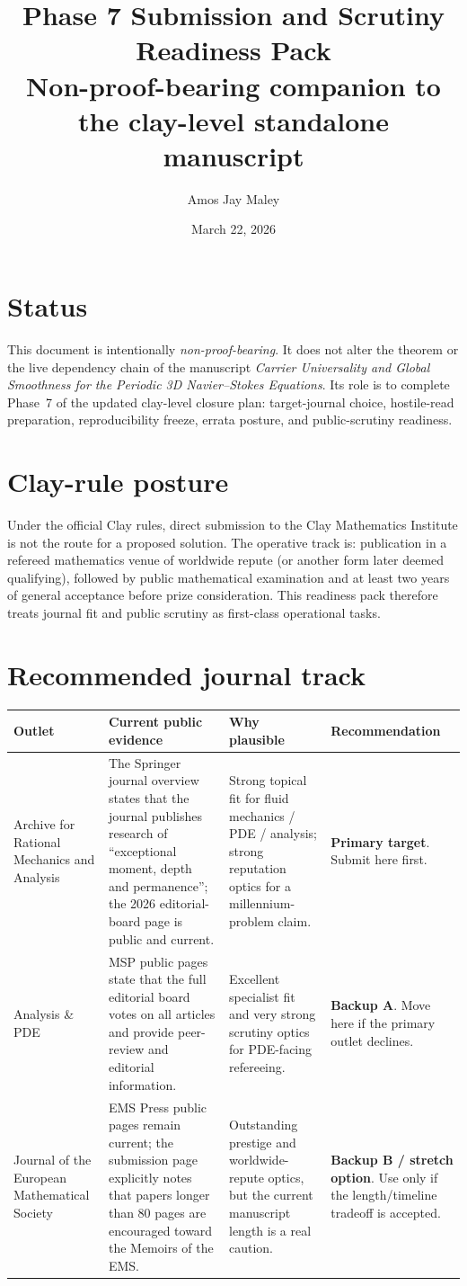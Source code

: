 \documentclass[11pt]{article}
\title{\textbf{Phase 7 Submission and Scrutiny Readiness Pack}\\[0.3em]\large Non-proof-bearing companion to the clay-level standalone manuscript}
\author{Amos Jay Maley}
\date{March 22, 2026}
\begin{document}
\maketitle

\section*{Status}
This document is intentionally \emph{non-proof-bearing}. It does not alter the theorem or the live dependency chain of the manuscript \emph{Carrier Universality and Global Smoothness for the Periodic 3D Navier--Stokes Equations}. Its role is to complete Phase~7 of the updated clay-level closure plan: target-journal choice, hostile-read preparation, reproducibility freeze, errata posture, and public-scrutiny readiness.

\section{Clay-rule posture}
Under the official Clay rules, direct submission to the Clay Mathematics Institute is not the route for a proposed solution. The operative track is: publication in a refereed mathematics venue of worldwide repute (or another form later deemed qualifying), followed by public mathematical examination and at least two years of general acceptance before prize consideration. This readiness pack therefore treats journal fit and public scrutiny as first-class operational tasks.

\section{Recommended journal track}
\begin{tabularx}{\textwidth}{@{}L{0.19\textwidth}L{0.28\textwidth}L{0.21\textwidth}Y@{}}
\toprule
\textbf{Outlet} & \textbf{Current public evidence} & \textbf{Why plausible} & \textbf{Recommendation}\\
\midrule
Archive for Rational Mechanics and Analysis & The Springer journal overview states that the journal publishes research of ``exceptional moment, depth and permanence''; the 2026 editorial-board page is public and current. & Strong topical fit for fluid mechanics / PDE / analysis; strong reputation optics for a millennium-problem claim. & \textbf{Primary target}. Submit here first.\\[0.4em]
Analysis \& PDE & MSP public pages state that the full editorial board votes on all articles and provide peer-review and editorial information. & Excellent specialist fit and very strong scrutiny optics for PDE-facing refereeing. & \textbf{Backup A}. Move here if the primary outlet declines.\\[0.4em]
Journal of the European Mathematical Society & EMS Press public pages remain current; the submission page explicitly notes that papers longer than 80 pages are encouraged toward the Memoirs of the EMS. & Outstanding prestige and worldwide-repute optics, but the current manuscript length is a real caution. & \textbf{Backup B / stretch option}. Use only if the length/timeline tradeoff is accepted.\\
\bottomrule
\end{tabularx}
\end{document}

